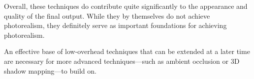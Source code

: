 \documentclass[11pt, oneside]{report}
\begin{document}
Overall, these techniques do contribute quite significantly to the appearance and quality of the final output. While they by themselves do not achieve photorealism, they definitely serve as important foundations for achieving photorealism.

An effective base of low-overhead techniques that can be extended at a later time are necessary for more advanced techniques---such as ambient occlusion or 3D shadow mapping---to build on.

\begingroup
	\printbibliography[
		heading=bibintoc,
		title={Bibliography}
	]
\endgroup

\printglossaries
\end{document}
